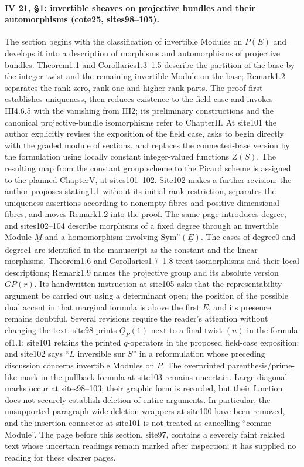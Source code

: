 \paragraph{IV 21, \S1: invertible sheaves on projective bundles and their automorphisms (cote25, sites98--105).}
The section begins with the classification of invertible Modules on $P(\underline E)$ and develops it into a description of morphisms and automorphisms of projective bundles. Theorem1.1 and Corollaries1.3--1.5 describe the partition of the base by the integer twist and the remaining invertible Module on the base; Remark1.2 separates the rank-zero, rank-one and higher-rank parts. The proof first establishes uniqueness, then reduces existence to the field case and invokes III4.6.5 with the vanishing from III2; its preliminary constructions and the canonical projective-bundle isomorphisms refer to ChapterII. At site101 the author explicitly revises the exposition of the field case, asks to begin directly with the graded module of sections, and replaces the connected-base version by the formulation using locally constant integer-valued functions $\underline Z(S)$. The resulting map from the constant group scheme to the Picard scheme is assigned to the planned ChapterV, at sites101--102. Site102 makes a further revision: the author proposes stating1.1 without its initial rank restriction, separates the uniqueness assertions according to nonempty fibres and positive-dimensional fibres, and moves Remark1.2 into the proof. The same page introduces degree, and sites102--104 describe morphisms of a fixed degree through an invertible Module $\underline M$ and a homomorphism involving $\underline{\mathrm{Sym}}^n(\underline E)$. The cases of degree0 and degree1 are identified in the manuscript as the constant and the linear morphisms. Theorem1.6 and Corollaries1.7--1.8 treat isomorphisms and their local descriptions; Remark1.9 names the projective group and its absolute version $GP(r)$. Its handwritten instruction at site105 asks that the representability argument be carried out using a determinant open; the position of the possible dual accent in that marginal formula is above the first $E$, and its presence remains doubtful. Several revisions require the reader's attention without changing the text: site98 prints $\underline O_P(1)$ next to a final twist $(n)$ in the formula of1.1; site101 retains the printed $q$-operators in the proposed field-case exposition; and site102 says ``$\underline L$ inversible sur $S$'' in a reformulation whose preceding discussion concerns invertible Modules on $P$. The overprinted parenthesis/prime-like mark in the pullback formula at site103 remains uncertain. Large diagonal marks occur at sites98--103; their graphic form is recorded, but their function does not securely establish deletion of entire arguments. In particular, the unsupported paragraph-wide deletion wrappers at site100 have been removed, and the insertion connector at site101 is not treated as cancelling ``comme Module''. The page before this section, site97, contains a severely faint related text whose uncertain readings remain marked after inspection; it has supplied no reading for these clearer pages.
